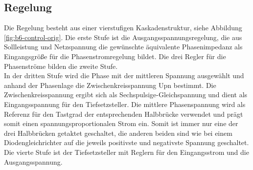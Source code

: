 			

		
		\subsection{Regelung}
			Die Regelung besteht aus einer vierstufigen Kaskadenstruktur, siehe Abbildung \ref{fig:b6-control-orig}. Die erste Stufe ist die Ausgangsspannungsregelung, die aus Sollleistung und Netzspannung die gewünschte äquivalente Phasenimpedanz als Eingangsgröße für die Phasenstromregelung bildet. Die drei Regler für die Phasenströme bilden die zweite Stufe.\\
			In der dritten Stufe wird die Phase mit der mittleren Spannung ausgewählt und anhand der Phasenlage die Zwischenkreisspannung \gls{Upn} bestimmt. Die Zwischenkreisspannung ergibt sich als Sechspulsige-Gleichspannung und dient als Eingangsspannung für den Tiefsetzsteller. Die mittlere Phasenspannung wird als Referenz für den Tastgrad der entsprechenden Halbbrücke verwendet und prägt somit einen spannungsproportionalen Strom ein. Somit ist immer nur eine der drei Halbbrücken getaktet geschaltet, die anderen beiden sind wie bei einem Diodengleichrichter auf die jeweils positivste und negativste Spannung geschaltet. Die vierte Stufe ist der Tiefsetzsteller mit Reglern für den Eingangsstrom und die Ausgangsspannung.
				
